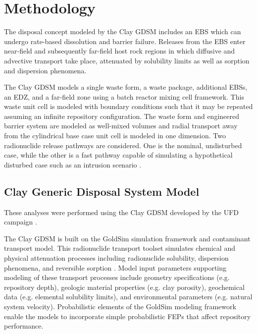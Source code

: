 \section{Methodology}

The disposal concept modeled by the Clay \gls{GDSM} includes an \gls{EBS} which 
can undergo rate-based dissolution and barrier failure. Releases from the 
\gls{EBS} enter 
near-field and subsequently far-field host rock regions in which diffusive and 
advective transport take place, attenuated by solubility limits as well as 
sorption and dispersion phenomena.  

The Clay \gls{GDSM} models a single waste form, a waste package, additional 
\glspl{EBS}, 
an \gls{EDZ}, and a far-field zone using a batch reactor mixing cell framework. 
This waste unit cell is modeled 
with boundary conditions such that it may be repeated assuming an infinite 
repository configuration. The waste form and engineered barrier system are 
modeled as well-mixed volumes 
and radial transport away from the cylindrical base case unit cell is modeled in 
one dimension. Two radionuclide release pathways are considered. One is the 
nominal, undisturbed case, while the other is a fast pathway capable of 
simulating a hypothetical disturbed case such as an intrusion scenario 
\cite{clayton_generic_2011}.

\subsection{Clay Generic Disposal System Model}

These analyses were performed using the Clay \gls{GDSM} developed by the 
\gls{UFD} campaign \cite{clayton_generic_2011}. 

The Clay \gls{GDSM} is built on the GoldSim simulation framework and contaminant 
transport model.  This radionuclide transport toolset simulates chemical and 
physical attenuation processes including radionuclide solubility, dispersion 
phenomena, and reversible sorption \cite{golder_goldsim_2010, 
golder_goldsim_ct_2010}. Model input parameters supporting modeling of these 
transport processes include geometry specifications (e.g. repository depth), 
geologic material properties (e.g. clay porosity), geochemical data (e.g. 
elemental solubility limits), and environmental parameters (e.g. natural system 
velocity). Probabilistic elements of the GoldSim modeling framework enable the 
models to incorporate simple probabilistic \gls{FEPs} that affect repository 
performance.

